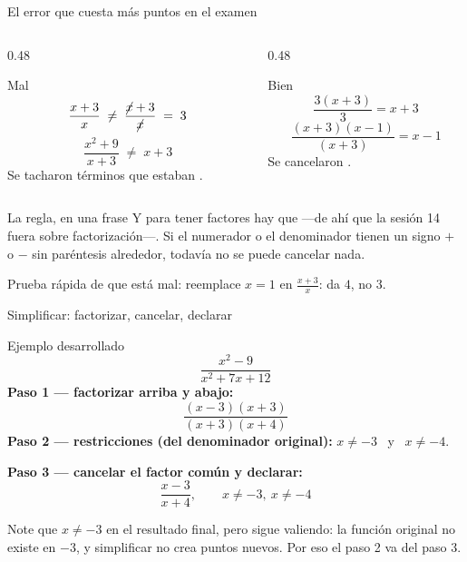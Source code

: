 \documentclass[aspectratio=169,10pt]{beamer}
\begin{document}
\begin{frame}{El error que cuesta más puntos en el examen}
  \scriptsize
  \begin{columns}[T,onlytextwidth]
    \begin{column}{0.48\textwidth}
      \begin{alertblock}{Mal}
        \tiny
        \[ \frac{x+3}{x} \;\neq\; \frac{\cancel{x}+3}{\cancel{x}} \;=\; 3 \]
        \[ \frac{x^{2}+9}{x+3} \;\neq\; x+3 \]
        Se tacharon términos que estaban .
      \end{alertblock}
    \end{column}
    \begin{column}{0.48\textwidth}
      \begin{exampleblock}{Bien}
        \tiny
        \[ \frac{3(x+3)}{3} = x+3 \]
        \[ \frac{(x+3)(x-1)}{(x+3)} = x-1 \]
        Se cancelaron .
      \end{exampleblock}
    \end{column}
  \end{columns}

  \vspace{0.15cm}
  \begin{block}{La regla, en una frase}
    \scriptsize
     Y para tener factores
    hay que  —de ahí que la sesión 14 fuera sobre
    factorización—. Si el numerador o el denominador tienen un signo $+$ o $-$
    sin paréntesis alrededor, todavía no se puede cancelar nada.
  \end{block}

  \vspace{0.08cm}
  {\tiny\color{uniGris} Prueba rápida de que está mal: reemplace $x=1$ en
  $\frac{x+3}{x}$: da $4$, no $3$.
  }
\end{frame}

\begin{frame}{Simplificar: factorizar, cancelar, declarar}
  \scriptsize
  \begin{exampleblock}{Ejemplo desarrollado}
    \scriptsize
    \[ \frac{x^{2}-9}{x^{2}+7x+12} \]
    \textbf{Paso 1 — factorizar arriba y abajo:}
    \[ \frac{(x-3)(x+3)}{(x+3)(x+4)} \]
    \textbf{Paso 2 — restricciones (del denominador original):}
    $x\neq -3$ \ y \ $x\neq -4$.

    \vspace{0.05cm}
    \textbf{Paso 3 — cancelar el factor común y declarar:}
    \[ \frac{x-3}{x+4}, \qquad x\neq -3,\ x\neq -4 \]
  \end{exampleblock}

  \vspace{0.08cm}
  {\tiny\color{uniGris} Note que $x\neq -3$  en el resultado
  final, pero sigue valiendo: la función original no existe en $-3$, y
  simplificar no crea puntos nuevos. Por eso el paso 2 va  del
  paso 3.}
\end{frame}
\end{document}
